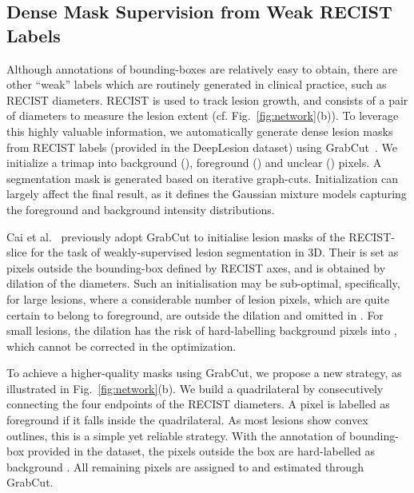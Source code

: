 \documentclass[runningheads,a4paper]{llncs}
\begin{document}
\vspace{-3mm}
\subsection{Dense Mask Supervision from Weak RECIST Labels}

Although annotations of bounding-boxes are relatively easy to obtain, there are other ``weak'' labels which are routinely generated in clinical practice, such as RECIST diameters. RECIST is used to track lesion growth, and consists of a pair of diameters to measure the lesion extent (cf. Fig.~\ref{fig:network}(b)). To leverage this highly valuable information, we automatically generate dense lesion masks from RECIST labels (provided in the DeepLesion dataset) using GrabCut~\cite{rother2004grabcut}.
We initialize a trimap into background (), foreground () and unclear () pixels. A segmentation mask is generated based on iterative graph-cuts. Initialization can largely affect the final result, as it defines the Gaussian mixture models capturing the foreground and background intensity distributions.

Cai et al.~\cite{cai2018accurate} previously adopt GrabCut to initialise lesion masks of the RECIST-slice for the task of weakly-supervised lesion segmentation in 3D. Their  is set as pixels outside the bounding-box defined by RECIST axes, and  is obtained by dilation of the diameters.
Such an initialisation may be sub-optimal, specifically, for large lesions, where a considerable number of lesion pixels, which are quite certain to belong to foreground, are outside the dilation and omitted in .
For small lesions, the dilation has the risk of hard-labelling background pixels into , which cannot be corrected in the optimization.

To achieve a higher-quality masks using GrabCut, we propose a new strategy, as illustrated in Fig.~\ref{fig:network}(b).
We build a quadrilateral by consecutively connecting the four endpoints of the RECIST diameters.
A pixel is labelled as foreground if it falls inside the quadrilateral.
As most lesions show convex outlines, this is a simple yet reliable strategy. With the annotation of bounding-box provided in the dataset, the
pixels outside the box are hard-labelled as background . All remaining pixels are assigned to  and estimated through GrabCut.
\end{document}
